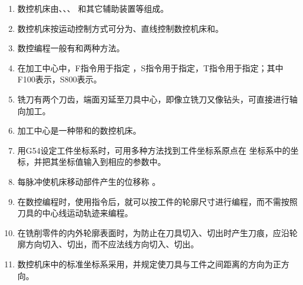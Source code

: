 \documentclass[12pt,twocolumn,landscape,UTF8,twoside,fontset=windows]{ctexart}%
\author{李老师}%
\begin{document}
\begin{enumerate} [1.]
	\item 数控机床由、、、 和其它辅助装置等组成。%

	\item 数控机床按运动控制方式可分为、直线控制数控机床和。%

	\item 数控编程一般有和两种方法。

	\item 在加工中心中，F指令用于指定 ，S指令用于指定，T指令用于指定；其中F100表示，S800表示。

	\item {}铣刀有两个刀齿，端面刃延至刀具中心，即像立铣刀又像钻头，可直接进行轴向加工。

	\item 加工中心是一种带和的数控机床。

	\item 用G54设定工件坐标系时，可用多种方法找到工件坐标系原点在 坐标系中的坐标，并把其坐标值输入到相应的参数中。

	\item 每脉冲使机床移动部件产生的位移称  。

	\item 在数控编程时，使用指令后，就可以按工件的轮廓尺寸进行编程，而不需按照刀具的中心线运动轨迹来编程。

	\item 在铣削零件的内外轮廓表面时，为防止在刀具切入、切出时产生刀痕，应沿轮廓方向切入、切出，而不应法线方向切入、切出。

	\item 数控机床中的标准坐标系采用，并规定使刀具与工件之间距离的方向为正方向。


\end{enumerate}
\end{document}
